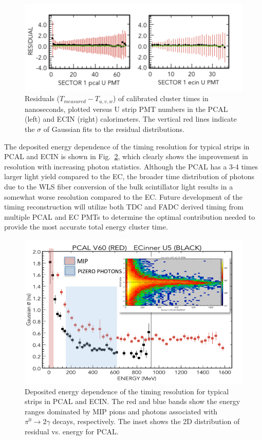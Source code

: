 \begin{figure}[hbt]
\centering
\includegraphics[width=1.0\columnwidth,keepaspectratio]{img/S9_2_1.png}
\caption[]{Residuals ($T_{measured}-T_{u,v,w}$) of calibrated cluster times in nanoseconds, plotted versus U strip
  PMT numbers in the PCAL (left) and ECIN (right) calorimeters. The vertical red lines indicate the $\sigma$ of
  Gaussian fits to the residual distributions.}  
\label{fig:S9_2_1}
\end{figure}

The deposited energy dependence of the timing resolution for typical strips in PCAL and ECIN is shown in
Fig.~\ref{fig:S9_2_2}, which clearly shows the improvement in resolution with increasing photon statistics. Although
the PCAL has a 3-4 times larger light yield compared to the EC, the broader time distribution of photons due to the
WLS fiber conversion of the bulk scintillator light results in a somewhat worse resolution compared to the EC. Future
development of the timing reconstruction will utilize both TDC and FADC derived timing from multiple PCAL and EC
PMTs to determine the optimal contribution needed to provide the most accurate total energy cluster time.

\begin{figure}[hbt]
\centering
\includegraphics[width=1.0\columnwidth,keepaspectratio]{img/S9_2_2.png}
\caption[]{Deposited energy dependence of the timing resolution for typical strips in PCAL and ECIN. The red
  and blue bands show the energy ranges dominated by MIP pions and photons associated with
  $\pi^0\rightarrow 2\gamma$ decays, respectively. The inset shows the 2D distribution of residual vs. energy
  for PCAL.}
\label{fig:S9_2_2}
\end{figure}


